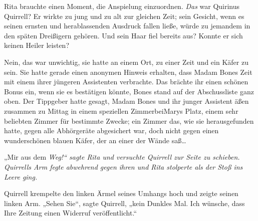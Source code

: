 Rita brauchte einen Moment, die Anspielung einzuordnen. \emph{Das} war Quirinus Quirrell? Er wirkte zu jung und zu alt zur gleichen Zeit; sein Gesicht, wenn es seinen ernsten und herablassenden Ausdruck fallen ließe, würde zu jemandem in den späten Dreißigern gehören. Und sein Haar fiel bereits aus? Konnte er sich keinen Heiler leisten?

Nein, das war unwichtig, sie hatte an einem Ort, zu einer Zeit und ein Käfer zu sein. Sie hatte gerade einen anonymen Hinweis erhalten, dass Madam Bones Zeit mit einem ihrer jüngeren Assistenten verbrachte. Das brächte ihr einen schönen Bonus ein, wenn sie es bestätigen könnte, Bones stand auf der Abschussliste ganz oben. Der Tippgeber hatte gesagt, Madam Bones und ihr junger Assistent äßen zusammen zu Mittag in einem speziellen ZimmerbeiMarys Platz, einem sehr beliebten Zimmer für bestimmte Zwecke; ein Zimmer das, wie sie herausgefunden hatte, gegen alle Abhörgeräte abgesichert war, doch nicht gegen einen wunderschönen blauen Käfer, der an einer der Wände saß…

„Mir aus dem \emph{Weg!“ sagte Rita und versuchte Quirrell zur Seite zu schieben. Quirrells Arm fegte abwehrend gegen ihren und Rita stolperte als der Stoß ins Leere ging.}

Quirrell krempelte den linken Ärmel seines Umhangs hoch und zeigte seinen linken Arm. „Sehen Sie“, sagte Quirrell, „kein Dunkles Mal. Ich wünsche, dass Ihre Zeitung einen Widerruf veröffentlicht.“

